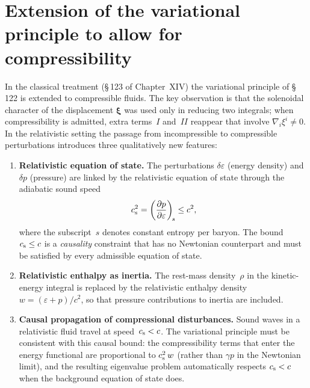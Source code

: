 
\section{Extension of the variational principle to allow for
  compressibility}\label{sec:rel-123}

In the classical treatment (\S\,123 of Chapter~XIV) the variational
principle of \S\,122 is extended to compressible fluids.  The key
observation is that the solenoidal character of the displacement
$\boldsymbol{\xi}$ was used only in reducing two integrals; when
compressibility is admitted, extra terms~$I$ and~$\mathit{II}$
reappear that involve $\nabla_{i}\xi^{i}\neq 0$.  In the
relativistic setting the passage from incompressible to compressible
perturbations introduces three qualitatively new features:
\begin{enumerate}
\item \textbf{Relativistic equation of state.}  The perturbations
  $\delta\varepsilon$ (energy density) and $\delta p$ (pressure) are
  linked by the relativistic equation of state through the adiabatic
  sound speed
  \begin{equation}\label{eq:rel-14-cs}
    c_{\mathrm{s}}^{2} = \left(\frac{\partial p}{\partial\varepsilon}\right)_{\!s}
    \le c^{2},
  \end{equation}
  where the subscript~$s$ denotes constant entropy per baryon.  The
  bound $c_{\mathrm{s}} \le c$ is a \emph{causality} constraint that has no
  Newtonian counterpart and must be satisfied by every admissible
  equation of state.

\item \textbf{Relativistic enthalpy as inertia.}  The rest-mass
  density~$\rho$ in the kinetic-energy integral is replaced by the
  relativistic enthalpy density $w = (\varepsilon + p)/c^{2}$, so
  that pressure contributions to inertia are included.

\item \textbf{Causal propagation of compressional disturbances.}
  Sound waves in a relativistic fluid travel at speed~$c_{\mathrm{s}} < c$.  The
  variational principle must be consistent with this causal bound:
  the compressibility terms that enter the energy functional are
  proportional to $c_{\mathrm{s}}^{2}\,w$ (rather than $\gamma p$ in the
  Newtonian limit), and the resulting eigenvalue problem automatically
  respects $c_{\mathrm{s}} < c$ when the background equation of state does.
\end{enumerate}

